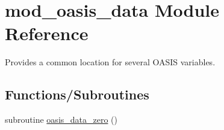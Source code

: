 \hypertarget{namespacemod__oasis__data}{}\section{mod\+\_\+oasis\+\_\+data Module Reference}
\label{namespacemod__oasis__data}


Provides a common location for several O\+A\+S\+IS variables.  


\subsection*{Functions/\+Subroutines}
\begin{DoxyCompactItemize}
\item 
subroutine \hyperlink{namespacemod__oasis__data_a7a3b7c8004b8d8869bbfa1fd4723da3e}{oasis\+\_\+data\+\_\+zero} ()
\end{DoxyCompactItemize}
